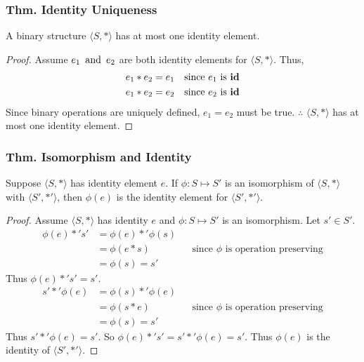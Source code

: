 \subsubsection{Thm. Identity Uniqueness}
A binary structure $\langle S, * \rangle$ has at most one identity element.

\begin{proof}
    Assume $e_1 \operatorname{~\text{and}~} e_2$ are both identity elements for $\langle S, * \rangle$. Thus,
    \begin{align*}
        e_1 * e_2 & = e_1 &  & \text{since $e_1$ is $\operatorname{\textbf{id}}$} \\
        e_1 * e_2 & = e_2 &  & \text{since $e_2$ is $\operatorname{\textbf{id}}$}
    \end{align*}
    Since binary operations are uniquely defined, $e_1 = e_2$ must be true.
    $\therefore$ $\langle S, * \rangle$ has at most one identity element.
\end{proof}

\subsubsection{Thm. Isomorphism and Identity}
Suppose $\langle S, * \rangle$ has identity element $e$. If $\phi: S \mapsto S'$ is an isomorphism of $\langle S, * \rangle$ with $\langle S', *' \rangle$, then $\phi(e)$ is the identity element for $\langle S', *' \rangle$.

\begin{proof}
    Assume $\langle S, * \rangle$ has identity $e$ and $\phi: S \mapsto S'$ is an isomorphism. Let $s' \in S'$.
    \begin{align*}
        \phi(e) *' s' & = \phi(e) *' \phi(s)                                                  \\
                      & = \phi(e * s)        &  & \text{since $\phi$ is operation preserving} \\
                      & = \phi(s) = s'
    \end{align*}
    Thus $\phi(e) *' s' = s'$.
    \begin{align*}
        s' *' \phi(e) & = \phi(s) *' \phi(e)                                                  \\
                      & = \phi(s * e)        &  & \text{since $\phi$ is operation preserving} \\
                      & = \phi(s) = s'
    \end{align*}
    Thus $s' *' \phi(e) = s'$. So $\phi(e) *' s' = s' *' \phi(e) = s'$. Thus $\phi(e)$ is the identity of $\langle S', *' \rangle$.
\end{proof}

